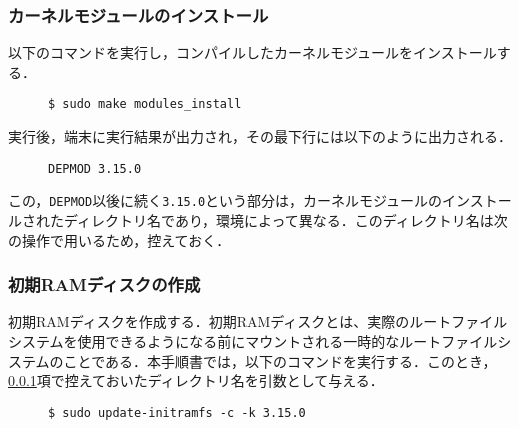 \documentclass[12pt]{jsarticle}
\begin{document}
\subsubsection{カーネルモジュールのインストール}\label{kermin}
以下のコマンドを実行し，コンパイルしたカーネルモジュールをインストールする．
\begin{description}
\item[] \verb|$ sudo make modules_install|
\end{description}
実行後，端末に実行結果が出力され，その最下行には以下のように出力される．
\begin{description}
\item[] \verb|DEPMOD 3.15.0|
\end{description}
この，\verb|DEPMOD|以後に続く\verb|3.15.0|という部分は，カーネルモジュールのインストールされたディレクトリ名であり，環境によって異なる．このディレクトリ名は次の操作で用いるため，控えておく．
\subsubsection{初期RAMディスクの作成}
初期RAMディスクを作成する．初期RAMディスクとは、実際のルートファイルシステムを使用できるようになる前にマウントされる一時的なルートファイルシステムのことである．本手順書では，以下のコマンドを実行する．このとき，\ref{kermin}項で控えておいたディレクトリ名を引数として与える．
\begin{description}
\item[] \verb|$ sudo update-initramfs -c -k 3.15.0|
\end{description}
\end{document}
